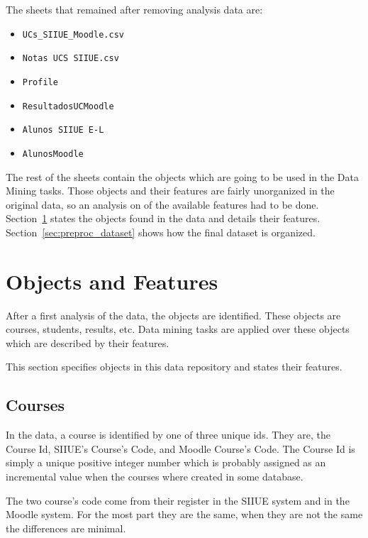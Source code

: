 The sheets that remained after removing analysis data are:

\begin{itemize}
    \item \texttt{UCs\_SIIUE\_Moodle.csv}
    \item \texttt{Notas UCS SIIUE.csv}
    \item \texttt{Profile}
    \item \texttt{ResultadosUCMoodle}
    \item \texttt{Alunos SIIUE E-L}
    \item \texttt{AlunosMoodle}
\end{itemize}

The rest of the sheets contain the objects which are going to be used in the
Data Mining tasks. Those objects and their features are fairly unorganized in
the original data, so an analysis on of the available features had to be done.
Section~\ref{sec:objs_feat} states the objects found in the data and details
their features. Section~\ref{sec:preproc_dataset} shows how the final dataset
is organized.

\section{Objects and Features}
\label{sec:objs_feat}

After a first analysis of the data, the objects are identified. These objects
are courses, students, results, etc. Data mining tasks are applied over these
objects which are described by their features.

This section specifies objects in this data repository and states their
features.

\subsection{Courses}
\label{sec:data_courses}

In the data, a course is identified by one of three unique ids. They are, the
Course Id, SIIUE's Course's Code, and Moodle Course's Code. The Course Id is
simply a unique positive integer number which is probably assigned as an
incremental value when the courses where created in some database.

The two course's code come from their register in the SIIUE system and in the
Moodle system. For the most part they are the same, when they are not the same
the differences are minimal.

